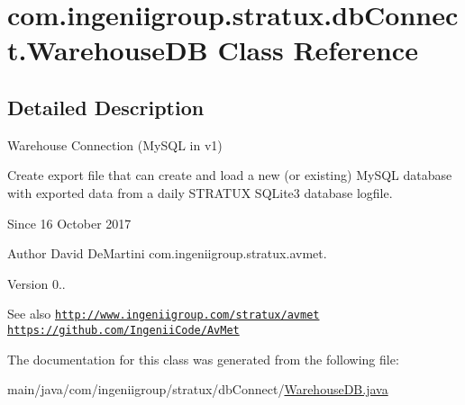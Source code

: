 \hypertarget{classcom_1_1ingeniigroup_1_1stratux_1_1db_connect_1_1_warehouse_d_b}{}\section{com.\+ingeniigroup.\+stratux.\+db\+Connect.\+Warehouse\+DB Class Reference}
\label{classcom_1_1ingeniigroup_1_1stratux_1_1db_connect_1_1_warehouse_d_b}


\subsection{Detailed Description}
Warehouse Connection (My\+S\+QL in v1)

Create export file that can create and load a new (or existing) My\+S\+QL database with exported data from a daily S\+T\+R\+A\+T\+UX S\+Q\+Lite3 database logfile.

\begin{DoxySince}{Since}
16 October 2017 
\end{DoxySince}
\begin{DoxyAuthor}{Author}
David De\+Martini  com.\+ingeniigroup.\+stratux.\+avmet. 
\end{DoxyAuthor}
\begin{DoxyVersion}{Version}
0.. 
\end{DoxyVersion}
\begin{DoxySeeAlso}{See also}
\href{http://www.ingeniigroup.com/stratux/avmet}{\tt http\+://www.\+ingeniigroup.\+com/stratux/avmet}  \href{https://github.com/IngeniiCode/AvMet}{\tt https\+://github.\+com/\+Ingenii\+Code/\+Av\+Met} 
\end{DoxySeeAlso}


The documentation for this class was generated from the following file\+:\begin{DoxyCompactItemize}
\item 
main/java/com/ingeniigroup/stratux/db\+Connect/\hyperlink{_warehouse_d_b_8java}{Warehouse\+D\+B.\+java}\end{DoxyCompactItemize}
